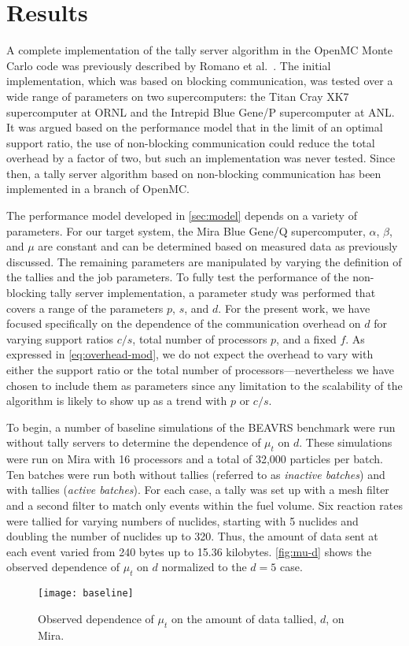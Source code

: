 \documentclass{snamc2013}
\begin{document}
\section{Results}
\label{sec:results}

A complete implementation of the tally server algorithm in the OpenMC Monte
Carlo code was previously described by Romano et al.~\cite{jcp-romano-2013}. The
initial implementation, which was based on blocking communication, was tested
over a wide range of parameters on two supercomputers: the Titan Cray XK7
supercomputer at ORNL and the Intrepid Blue Gene/P supercomputer at ANL. It was
argued based on the performance model that in the limit of an optimal support
ratio, the use of non-blocking communication could reduce the total overhead by
a factor of two, but such an implementation was never tested. Since then, a
tally server algorithm based on non-blocking communication has been implemented
in a branch of OpenMC.

The performance model developed in \autoref{sec:model} depends on a variety of
parameters. For our target system, the Mira Blue Gene/Q supercomputer, $\alpha$,
$\beta$, and $\mu$ are constant and can be determined based on measured data as
previously discussed. The remaining parameters are manipulated by varying the
definition of the tallies and the job parameters. To fully test the performance
of the non-blocking tally server implementation, a parameter study was performed
that covers a range of the parameters $p$, $s$, and $d$. For the present work,
we have focused specifically on the dependence of the communication overhead on
$d$ for varying support ratios $c/s$, total number of processors $p$, and a
fixed $f$. As expressed in \autoref{eq:overhead-mod}, we do not expect the
overhead to vary with either the support ratio or the total number of
processors---nevertheless we have chosen to include them as parameters since any
limitation to the scalability of the algorithm is likely to show up as a trend
with $p$ or $c/s$.

To begin, a number of baseline simulations of the BEAVRS benchmark were run
without tally servers to determine the dependence of $\mu_t$ on $d$. These
simulations were run on Mira with 16 processors and a total of 32,000 particles
per batch. Ten batches were run both without tallies (referred to as
\emph{inactive batches}) and with tallies (\emph{active batches}). For each
case, a tally was set up with a mesh filter and a second filter to match only
events within the fuel volume. Six reaction rates were tallied for varying
numbers of nuclides, starting with 5 nuclides and doubling the number of
nuclides up to 320. Thus, the amount of data sent at each event varied from 240
bytes up to 15.36 kilobytes. \autoref{fig:mu-d} shows the observed dependence of
$\mu_t$ on $d$ normalized to the $d=5$ case.
\begin{figure}
  \centering
  \texttt{[image: baseline]}
  \caption{Observed dependence of $\mu_t$ on the amount of data tallied, $d$, on
    Mira.}
  \label{fig:mu-d}
\end{figure}
\end{document}
